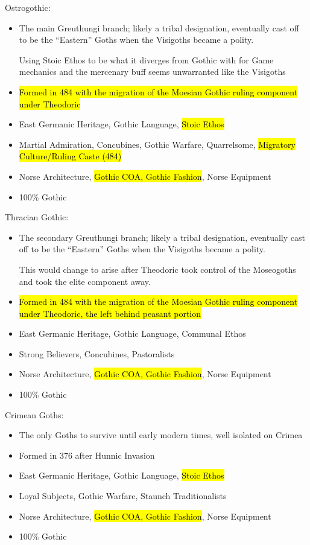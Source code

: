 \documentclass{article}
\begin{document}
	Ostrogothic:
	\begin{itemize}
		\item The main Greuthungi branch; likely a tribal designation, eventually cast off to be the “Eastern” Goths when the Visigoths became a polity.
		
		Using Stoic Ethos to be what it diverges from Gothic with for Game mechanics and the mercenary buff seems unwarranted like the Visigoths
		\item \hl{Formed in 484 with the migration of the Moesian Gothic ruling component under Theodoric}
		\item East Germanic Heritage, Gothic Language, \hl{Stoic Ethos}
		\item Martial Admiration, Concubines, Gothic Warfare, Quarrelsome, \hl{Migratory Culture/Ruling Caste (484)}
		\item Norse Architecture, \hl{Gothic COA, Gothic Fashion}, Norse Equipment
		\item 100\% Gothic
	\end{itemize}
	
	Thracian Gothic:
	\begin{itemize}
		\item The secondary Greuthungi branch; likely a tribal designation, eventually cast off to be the “Eastern” Goths when the Visigoths became a polity.
		
		This would change to arise after Theodoric took control of the Moseogoths and took the elite component away.
		\item \hl{Formed in 484 with the migration of the Moesian Gothic ruling component under Theodoric, the left behind peasant portion}
		\item East Germanic Heritage, Gothic Language, Communal Ethos
		\item Strong Believers, Concubines, Pastoralists
		\item Norse Architecture, \hl{Gothic COA, Gothic Fashion}, Norse Equipment
		\item 100\% Gothic
	\end{itemize}
	
	Crimean Goths:
	\begin{itemize}
		\item The only Goths to survive until early modern times, well isolated on Crimea
		\item Formed in 376 after Hunnic Invasion
		\item East Germanic Heritage, Gothic Language, \hl{Stoic Ethos}
		\item Loyal Subjects, Gothic Warfare, Staunch Traditionalists
		\item Norse Architecture, \hl{Gothic COA, Gothic Fashion}, Norse Equipment
		\item 100\% Gothic
	\end{itemize}
	
\end{document}
